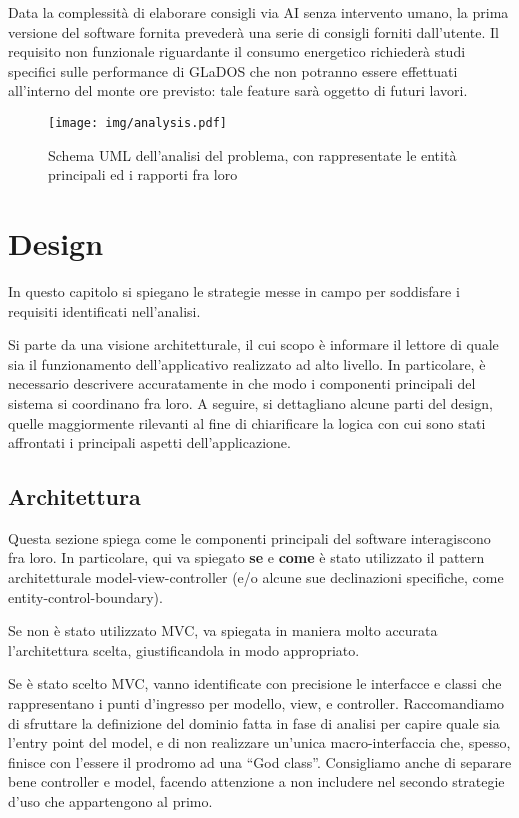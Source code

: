 \documentclass[a4paper,12pt]{report}
\begin{document}
Data la complessità di elaborare consigli via AI senza intervento umano, la prima versione del software fornita prevederà una serie di consigli forniti dall'utente.
%
Il requisito non funzionale riguardante il consumo energetico richiederà studi specifici sulle performance di GLaDOS che non potranno essere effettuati all'interno del monte ore previsto: tale feature sarà oggetto di futuri lavori.

\begin{figure}[H]
\centering{}
\texttt{[image: img/analysis.pdf]}
\caption{Schema UML dell'analisi del problema, con rappresentate le entità principali ed i rapporti fra loro}
\label{img:analysis}
\end{figure}

\chapter{Design}

In questo capitolo si spiegano le strategie messe in campo per soddisfare i requisiti identificati nell'analisi.

Si parte da una visione architetturale, il cui scopo è informare il lettore di quale sia il funzionamento dell'applicativo realizzato ad alto livello.
%
In particolare, è necessario descrivere accuratamente in che modo i componenti principali del sistema si coordinano fra loro.
%
A seguire, si dettagliano alcune parti del design, quelle maggiormente rilevanti al fine di chiarificare la logica con cui sono stati affrontati i principali aspetti dell'applicazione.

\section{Architettura}

Questa sezione spiega come le componenti principali del software interagiscono fra loro.
%
In particolare, qui va spiegato \textbf{se} e \textbf{come} è stato utilizzato il pattern
architetturale model-view-controller (e/o alcune sue declinazioni specifiche, come entity-control-boundary).

Se non è stato utilizzato MVC, va spiegata in maniera molto accurata l'architettura scelta, giustificandola in modo appropriato.

Se è stato scelto MVC, vanno identificate con precisione le interfacce e classi che rappresentano i punti d'ingresso per modello, view, e controller.
Raccomandiamo di sfruttare la definizione del dominio fatta in fase di analisi per capire quale sia l'entry point del model, e di non realizzare un'unica macro-interfaccia che, spesso, finisce con l'essere il prodromo ad una ``God class''.
%
Consigliamo anche di separare bene controller e model, facendo attenzione a non includere nel secondo strategie d'uso che appartengono al primo.
\end{document}
